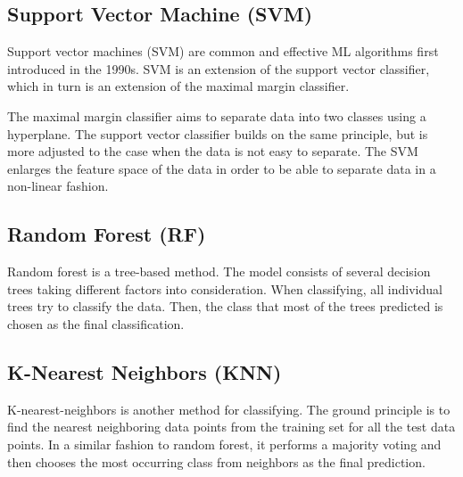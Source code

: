 \documentclass{kththesis}
\begin{document}
\subsection{Support Vector Machine (SVM)}

Support vector machines (SVM) are common and effective ML algorithms first introduced in the 1990s. SVM is an extension of the support vector classifier, which in turn is an extension of the maximal margin classifier.

The maximal margin classifier aims to separate data into two classes using a hyperplane. The support vector classifier builds on the same principle, but is more adjusted to the case when the data is not easy to separate. The SVM enlarges the feature space of the data in order to be able to separate data in a non-linear fashion.




\subsection{Random Forest (RF)}

Random forest is a tree-based method. The model consists of several decision trees taking different factors into consideration. When classifying, all individual trees try to classify the data. Then, the class that most of the trees predicted is chosen as the final classification.


\subsection{K-Nearest Neighbors (KNN)}

K-nearest-neighbors is another method for classifying. The ground principle is to find the nearest neighboring data points from the training set for all the test data points. In a similar fashion to random forest, it performs a majority voting and then chooses the most occurring class from neighbors as the final prediction.

\end{document}
